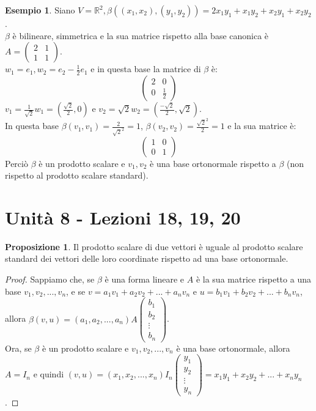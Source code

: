 \documentclass[a4paper]{article}
\theoremstyle{definition}
\newtheorem*{es}{Esempio}
\newtheorem*{prop}{Proposizione}
\begin{document}
	\begin{es}
		Siano $V = \mathbb{R}^2, \beta((x_1, x_2), (y_1, y_2)) = 2x_1y_1 + x_1y_2 + x_2y_1 + x_2y_2$. \\
		$\beta$ è bilineare, simmetrica e la sua matrice rispetto alla base canonica è $A = \begin{pmatrix}
			2 & 1 \\
			1 & 1
		\end{pmatrix}$. \\
		$w_1 = e_1, w_2 = e_2 - \frac{1}{2}e_1$ e in questa base la matrice di $\beta$ è:
		\begin{equation*}
			\begin{pmatrix}
				2 & 0 \\
				0 & \frac{1}{2}
			\end{pmatrix}
		\end{equation*}
		$v_1 = \frac{1}{\sqrt{2}}w_1 = (\frac{\sqrt{2}}{2}, 0)$ e $v_2 = \sqrt{2}w_2 = (\frac{-\sqrt{2}}{2}, \sqrt{2})$. \\
		In questa base $\beta(v_1, v_1) = \frac{2}{\sqrt{2}^2} = 1$, $\beta(v_2, v_2) = \frac{\sqrt{2}^2}{2} = 1$ e la sua matrice è:
		\begin{equation*}
			\begin{pmatrix}
				1 & 0 \\
				0 & 1
			\end{pmatrix}
		\end{equation*}
		Perciò $\beta$ è un prodotto scalare e $v_1, v_2$ è una base ortonormale rispetto a $\beta$ (non rispetto al prodotto scalare standard).
	\end{es}

	\section{Unità 8  - Lezioni 18, 19, 20}
	\begin{prop}
		Il prodotto scalare di due vettori è uguale al prodotto scalare standard dei vettori delle loro coordinate rispetto ad una base ortonormale.
	\end{prop}
	\begin{proof}
		Sappiamo che, se $\beta$ è una forma lineare e $A$ è la sua matrice rispetto a una base $v_1, v_2, ..., v_n$, e se
		$v = a_1v_1 + a_2v_2 + ... + a_nv_n$ e $u = b_1v_1 + b_2v_2 + ... + b_nv_n$, allora $\beta(v, u) = (a_1, a_2, ..., a_n)A \begin{pmatrix}
			b_1 \\
			b_2 \\
			\vdots \\
			b_n
		\end{pmatrix}$. \\
		Ora, se $\beta$ è un prodotto scalare e $v_1, v_2, ..., v_n$ è una base ortonormale, allora $A = I_n$ e quindi $(v, u) = (x_1, x_2, ..., x_n)I_n \begin{pmatrix}
			y_1 \\
			y_2 \\
			\vdots \\
			y_n
		\end{pmatrix} = x_1y_1 + x_2y_2 + ... + x_ny_n$.
	\end{proof}
\end{document}
